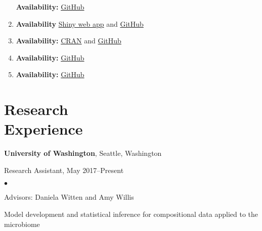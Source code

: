 \documentclass[margin,centered]{res}
\newenvironment{list1}{
  \begin{list}{\ding{113}}{%
      \setlength{\itemsep}{0in}
      \setlength{\parsep}{0in} \setlength{\parskip}{0in}
      \setlength{\topsep}{0in} \setlength{\partopsep}{0in}
      \setlength{\leftmargin}{0.17in}}}{\end{list}}
\newenvironment{list2}{
  \begin{list}{$\bullet$}{%
      \setlength{\itemsep}{0in}
      \setlength{\parsep}{0in} \setlength{\parskip}{0in}
      \setlength{\topsep}{0in} \setlength{\partopsep}{0in}
      \setlength{\leftmargin}{0.2in}}}{\end{list}}
\begin{document}
\begin{resume}
\begin{enumerate}[leftmargin=*]
\textbf{Availability:}
\href{https://github.com/bryandmartin/corncob}{GitHub}

\item {}

\textbf{Availability}
\href{https://serrat839.shinyapps.io/mRkov_shiny/}{Shiny web app} and \href{https://github.com/serrate839/mRkov}{GitHub}

    \item {}
    
    \textbf{Availability:} \href{https://CRAN.R-project.org/package=SUMMER}{CRAN} and \href{https://github.com/bryandmartin/SUMMER}{GitHub}
    \item {}
    
    \textbf{Availability:} \href{https://github.com/adw96/DivNet}{GitHub}
    
    \item {}
    
    \textbf{Availability:}
    \href{https://github.com/adw96/breakaway}{GitHub}
\end{enumerate}



\section{\sc Research\\ Experience}
{\bf University of Washington},  Seattle, Washington
\begin{list1}
\item[] 
Research Assistant, May 2017--Present
\begin{list2}
\vspace*{.05in}
\item Advisors: Daniela Witten and Amy Willis
\item Model development and statistical inference for compositional data applied to the microbiome
\end{list2} 
\end{list1}

\newpage


\end{resume}
\end{document}
